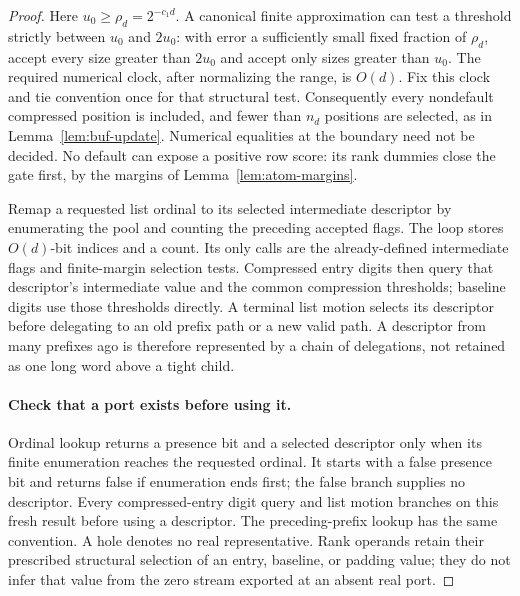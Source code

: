 \begin{proof}
Here $u_0\ge\rho_d=2^{-c_1d}$.  A canonical finite approximation can
test a threshold strictly between $u_0$ and $2u_0$: with error a
sufficiently small fixed fraction of $\rho_d$, accept every size
greater than $2u_0$ and accept only sizes greater than $u_0$.
The required numerical clock, after normalizing the range, is $O(d)$.
Fix this clock and tie convention once for that structural test.
Consequently every nondefault compressed position is included, and
fewer than $n_d$ positions are selected, as in
Lemma~\ref{lem:buf-update}.  Numerical equalities at the boundary need
not be decided.  No default can expose a positive row score: its
rank dummies close the gate first, by the margins of
Lemma~\ref{lem:atom-margins}.

Remap a requested list ordinal to its selected intermediate descriptor
by enumerating the pool and counting the preceding accepted flags.
The loop stores $O(d)$-bit indices and a count.  Its only calls are the
already-defined intermediate flags and finite-margin selection tests.
Compressed entry digits then query that descriptor's intermediate value
and the common compression thresholds; baseline digits use those
thresholds directly.  A terminal list motion selects its descriptor
before delegating to an old prefix path or a new valid path.  A
descriptor from many prefixes ago is therefore represented by a chain
of delegations, not retained as one long word above a tight child.

\paragraph{Check that a port exists before using it.}
Ordinal lookup returns a presence bit and a selected descriptor only
when its finite enumeration reaches the requested ordinal. It starts
with a false presence bit and returns false if enumeration ends first;
the false branch supplies no descriptor. Every compressed-entry digit
query and list motion branches on this fresh result before using a
descriptor. The preceding-prefix lookup has the same convention.
A hole denotes no real representative. Rank operands retain their
prescribed structural selection of an entry, baseline, or padding
value; they do not infer that value from the zero stream exported
at an absent real port.


\end{proof}
